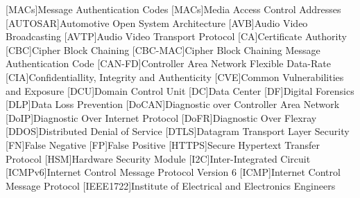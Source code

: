 %
\begin{acronym}
[MACs]{Message Authentication Codes}	%
[MACs]{Media Access Control Addresses}	%
[AUTOSAR]{Automotive Open System Architecture}    %
[AVB]{Audio Video Broadcasting}
[AVTP]{Audio Video Transport Protocol}
[CA]{Certificate Authority}
[CBC]{Cipher Block Chaining}    %
[CBC-MAC]{Cipher Block Chaining Message Authentication Code}    %
[CAN-FD]{Controller Area Network Flexible Data-Rate}
[CIA]{Confidentiallity, Integrity and Authenticity}               %
[CVE]{Common Vulnerabilities and Exposure}
[DCU]{Domain Control Unit}
[DC]{Data Center}
[DF]{Digital Forensics}
[DLP]{Data Loss Prevention}
[DoCAN]{Diagnostic over Controller Area Network}
[DoIP]{Diagnostic Over Internet Protocol}
[DoFR]{Diagnostic Over Flexray}
[DDOS]{Distributed Denial of Service}
[DTLS]{Datagram Transport Layer Security}
[FN]{False Negative}
[FP]{False Positive}
[HTTPS]{Secure Hypertext Transfer Protocol }
[HSM]{Hardware Security Module}
[I2C]{Inter-Integrated Circuit}
[ICMPv6]{Internet Control Message Protocol Version 6}
[ICMP]{Internet Control Message Protocol}
[IEEE1722]{Institute of Electrical and Electronics Engineers}

\end{acronym}
